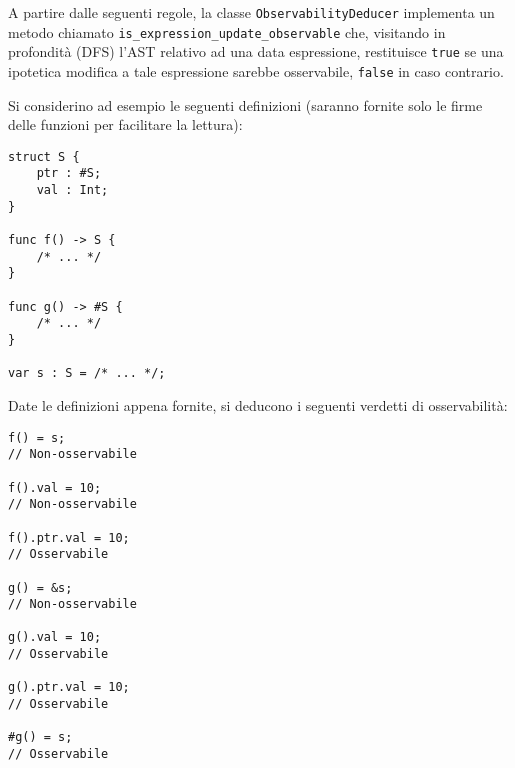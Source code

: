 A partire dalle seguenti regole, la classe \texttt{ObservabilityDeducer} implementa un metodo
chiamato \texttt{is\_expression\_update\_observable} che, visitando in profondità (DFS) l'AST relativo
ad una data espressione, restituisce \texttt{true} se una ipotetica modifica a tale 
espressione sarebbe osservabile, \texttt{false} in caso contrario. \\

\newpage

Si considerino ad esempio le seguenti definizioni (saranno fornite solo le firme 
delle funzioni per facilitare la lettura): \\

\vspace{0.5cm}
\begin{lstlisting}[frame=single]
struct S {
    ptr : #S;
    val : Int;
}

func f() -> S { 
    /* ... */ 
}

func g() -> #S { 
    /* ... */ 
}

var s : S = /* ... */;
\end{lstlisting}
\vspace{0.5cm}

Date le definizioni appena fornite, si deducono i seguenti verdetti di 
osservabilità: \\

\vspace{0.5cm}
\begin{lstlisting}[frame=single]
f() = s; 
// Non-osservabile

f().val = 10; 
// Non-osservabile

f().ptr.val = 10; 
// Osservabile

g() = &s; 
// Non-osservabile

g().val = 10; 
// Osservabile

g().ptr.val = 10; 
// Osservabile

#g() = s; 
// Osservabile
\end{lstlisting}
\vspace{0.5cm}

\newpage